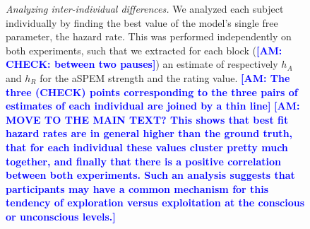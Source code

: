 \documentclass[12pt,english]{article}%
\newcommand{\seeFig}[1]{Figure~\ref{fig:#1}}
\newcommand{\AM}[1]{\textbf{\textcolor{blue}{[AM: #1]}}}
\begin{document}
\begin{figure}%
\caption{\emph{Analyzing inter-individual differences.} %
We analyzed each subject individually by finding 
the best value of the model's single free parameter, the hazard rate.
This was performed independently on both experiments, 
such that we extracted for each block (\AM{CHECK: between two pauses}) 
an estimate of respectively $h_A$ and $h_R$ 
for the aSPEM strength and the rating value. \AM{The three (CHECK) points corresponding to 
the three pairs of estimates of each individual are joined by a thin line} 
\AM{MOVE TO THE MAIN TEXT? This shows that best fit hazard rates are in general higher than the ground truth, 
that for each individual these values cluster pretty much together, 
and finally that there is a positive correlation between both experiments.
Such an analysis suggests that participants may have 
a common mechanism for this tendency of exploration versus exploitation 
at the conscious or unconscious levels.}
}
\label{fig:results_inter}
\end{figure}
\end{document}
